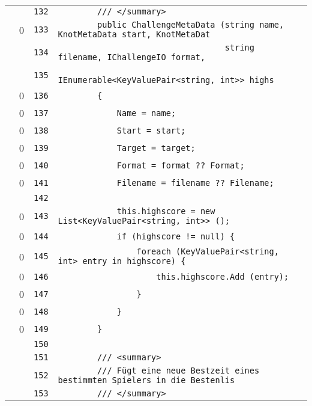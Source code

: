 \documentclass[a4paper,10pt]{article}
\begin{document}
\begin{longtable}[l]{lrrl}
\cellcolor{gray} &  & \verb~132~ & \verb~        /// </summary>~\\
\cellcolor{red} & 0 & \verb~133~ & \verb~        public ChallengeMetaData (string name, KnotMetaData start, KnotMetaDat~\\
\cellcolor{gray} &  & \verb~134~ & \verb~                                  string filename, IChallengeIO format,~\\
\cellcolor{gray} &  & \verb~135~ & \verb~                                  IEnumerable<KeyValuePair<string, int>> highs~\\
\cellcolor{red} & 0 & \verb~136~ & \verb~        {~\\
\cellcolor{red} & 0 & \verb~137~ & \verb~            Name = name;~\\
\cellcolor{red} & 0 & \verb~138~ & \verb~            Start = start;~\\
\cellcolor{red} & 0 & \verb~139~ & \verb~            Target = target;~\\
\cellcolor{red} & 0 & \verb~140~ & \verb~            Format = format ?? Format;~\\
\cellcolor{red} & 0 & \verb~141~ & \verb~            Filename = filename ?? Filename;~\\
\cellcolor{gray} &  & \verb~142~ & \verb~~\\
\cellcolor{red} & 0 & \verb~143~ & \verb~            this.highscore = new List<KeyValuePair<string, int>> ();~\\
\cellcolor{red} & 0 & \verb~144~ & \verb~            if (highscore != null) {~\\
\cellcolor{red} & 0 & \verb~145~ & \verb~                foreach (KeyValuePair<string, int> entry in highscore) {~\\
\cellcolor{red} & 0 & \verb~146~ & \verb~                    this.highscore.Add (entry);~\\
\cellcolor{red} & 0 & \verb~147~ & \verb~                }~\\
\cellcolor{red} & 0 & \verb~148~ & \verb~            }~\\
\cellcolor{red} & 0 & \verb~149~ & \verb~        }~\\
\cellcolor{gray} &  & \verb~150~ & \verb~~\\
\cellcolor{gray} &  & \verb~151~ & \verb~        /// <summary>~\\
\cellcolor{gray} &  & \verb~152~ & \verb~        /// Fügt eine neue Bestzeit eines bestimmten Spielers in die Bestenlis~\\
\cellcolor{gray} &  & \verb~153~ & \verb~        /// </summary>~\\

\end{longtable}
\end{document}
